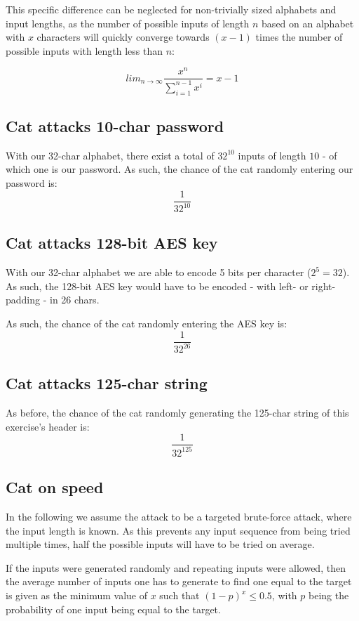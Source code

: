 \documentclass[a4paper]{scrreprt}
\begin{document}
This specific difference can be neglected for non-trivially sized alphabets and
input lengths, as the number of possible inputs of length $n$ based on an
alphabet with $x$ characters will quickly converge towards $(x - 1)$ times the
number of possible inputs with length less than $n$:

\[
	lim_{n\to\infty} \frac{x^n}{\sum_{i=1}^{n-1}{x^i}} = x-1
\]

\subsection{Cat attacks 10-char password}

With our 32-char alphabet, there exist a total of $32^{10}$ inputs of length $10$
- of which one is our password. As such, the chance of the cat randomly entering our password is:
\[
	\frac{1}{32^{10}}
\]

\subsection{Cat attacks 128-bit AES key}

With our 32-char alphabet we are able to encode 5 bits per character ($2^5 =
32$). As such, the 128-bit AES key would have to be encoded - with left- or
right-padding - in 26 chars.

As such, the chance of the cat randomly entering the AES key is:
\[
	\frac{1}{32^{26}}
\]

\subsection{Cat attacks 125-char string}

As before, the chance of the cat randomly generating the 125-char string of this exercise's header is:
\[
	\frac{1}{32^{125}}
\]

\subsection{Cat on speed}

In the following we assume the attack to be a targeted brute-force attack,
where the input length is known. As this prevents any input sequence from being
tried multiple times, half the possible inputs will have to be tried on
average.

If the inputs were generated randomly and repeating inputs were allowed, then
the average number of inputs one has to generate to find one equal to the
target is given as the minimum value of $x$ such that $(1-p)^x \leq 0.5$, with
$p$ being the probability of one input being equal to the target.
\end{document}
